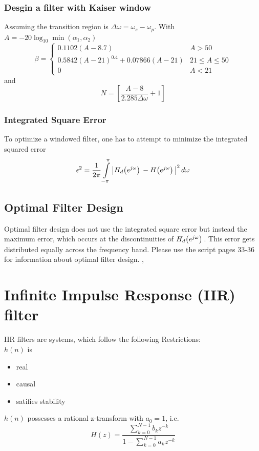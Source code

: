 \documentclass[accentcolor=tud4c,9.5pt,nochapname,bigchapter,paper=a5report]{tudreport}
\begin{document}
\subsubsection{Desgin a filter with Kaiser window}
Assuming the transition region is $\Delta\omega = \omega_s-\omega_p$. With $A = -20\log_{10}\min(\alpha_1,\alpha_2)$
\begin{equation}
\beta = \begin{cases}
0.1102(A-8.7) &A>50 \\
0.5842(A-21)^{0.4}+0.07866(A-21) &21\leq A \leq 50 \\
0 &A<21
\end{cases}
\end{equation}
and
\begin{equation}
N=\left[\frac{A-8}{2.285\Delta\omega}+1\right]
\end{equation}
\subsubsection{Integrated Square Error}
To optimize a windowed filter, one has to attempt to minimize the integrated squared error
\begin{equation}
\epsilon^2=\frac{1}{2\pi}\int\limits_{-\pi}^{\pi}\left|H_d{\left(e^{j\omega}\right)}\, - H{\left(e^{j\omega}\right)}\,\right|^2 d\omega
\end{equation}

\subsection{Optimal Filter Design}
Optimal filter design does not use the integrated square error but instead the maximum error, which occurs at the discontinuities of $H_d{\left(e^{j\omega}\right)}\,$.
This error gets distributed equally across the frequency band.
Please use the script pages 33-36 for information about optimal filter design.
,

\section{Infinite Impulse Response (IIR) filter}
IIR filters are systems, which follow the following Restrictions:\\
$h(n)$ is
  \begin{itemize}
  	\item real
  	\item causal
  	\item satifies stability
  \end{itemize}
$h(n)$ possesses a rational z-transform with $a_0=1$, i.e.
\begin{equation}
  	H(z)=\frac{\sum\limits_{k=0}^{N-1} b_k z^{-k}}{1-\sum\limits_{k=0}^{N-1} a_k z^{-k}}
\end{equation}
  
\end{document}
